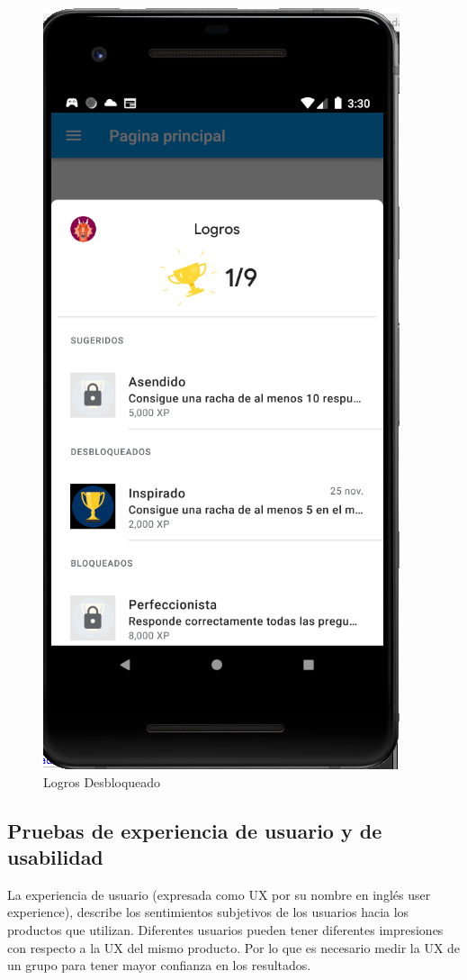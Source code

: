 \documentclass{article}
\begin{document}
\begin{figure}[H]
    \centering
    \includegraphics[scale=0.8]{imgs/Test/LogroDes2}
    \caption{Logros Desbloqueado}
    \label{fig:pruebas_03}
\end{figure}

\subsection{Pruebas de experiencia de usuario y de usabilidad}
La experiencia de usuario (expresada como UX por su nombre en inglés user experience), 
describe los sentimientos subjetivos de los usuarios hacia los productos que utilizan. 
Diferentes usuarios pueden tener diferentes impresiones con respecto a la UX del mismo 
producto. Por lo que es necesario medir la UX de un grupo para tener mayor confianza 
en los resultados\cite{santoso2016measuring}.
\end{document}
